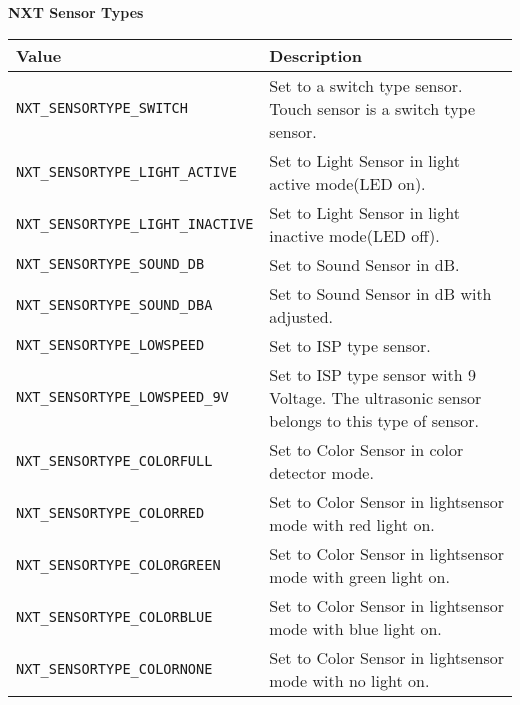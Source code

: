 \noindent
{\bf NXT Sensor Types}\\
\begin{longtable}{p{5.5cm}p{10cm}}
    \hline
Value &       Description\\
\hline
{\tt NXT\_SENSORTYPE\_SWITCH}        &Set to a switch type sensor. Touch sensor is a switch type sensor.\\
{\tt NXT\_SENSORTYPE\_LIGHT\_ACTIVE} &Set to Light Sensor in light active mode(LED on).\\
{\tt NXT\_SENSORTYPE\_LIGHT\_INACTIVE}&Set to Light Sensor in light inactive mode(LED off).\\
{\tt NXT\_SENSORTYPE\_SOUND\_DB}     &Set to Sound Sensor in dB.\\
{\tt NXT\_SENSORTYPE\_SOUND\_DBA}    &Set to Sound Sensor in dB with adjusted.\\
{\tt NXT\_SENSORTYPE\_LOWSPEED}      &Set to ISP type sensor.\\
{\tt NXT\_SENSORTYPE\_LOWSPEED\_9V}  &Set to ISP type sensor with 9 Voltage. The ultrasonic sensor belongs to this type of sensor.\\
{\tt NXT\_SENSORTYPE\_COLORFULL}     &Set to Color Sensor in color detector mode.\\
{\tt NXT\_SENSORTYPE\_COLORRED}      &Set to Color Sensor in lightsensor mode with red light on.\\
{\tt NXT\_SENSORTYPE\_COLORGREEN}    &Set to Color Sensor in lightsensor mode with green light on.\\
{\tt NXT\_SENSORTYPE\_COLORBLUE}     &Set to Color Sensor in lightsensor mode with blue light on.\\
{\tt NXT\_SENSORTYPE\_COLORNONE}     &Set to Color Sensor in lightsensor mode with no light on.\\
\hline
\end{longtable}

